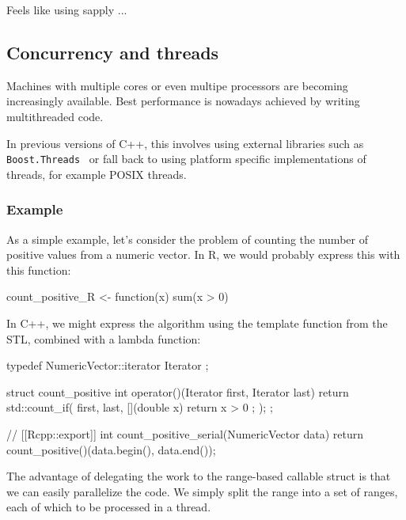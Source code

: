 Feels like using sapply ...

\subsection{Concurrency and threads}

Machines with multiple cores or even multipe 
processors are becoming increasingly available. Best performance 
is nowadays achieved by writing multithreaded code. 

In previous versions of C++, this involves using external libraries 
such as \texttt{Boost.Threads}~\citep{KempfBoostThreads} 
or fall back to using platform specific 
implementations of threads, for example POSIX threads. 

\subsubsection{Example}

As a simple example, let's consider the problem of counting the number
of positive values from a numeric vector. In R, we would probably express this
with this function: 

\begin{example}
count_positive_R <- function(x){
  sum(x > 0)
}
\end{example}

In C++, we might express the algorithm using the  template
function from the STL, combined with a lambda function:

\begin{example}
typedef NumericVector::iterator Iterator ;

struct count_positive {
  int operator()(Iterator first, Iterator last){
    return std::count_if( first, last, 
      [](double x){ return x > 0 ; } 
    );    
  }
} ;

// [[Rcpp::export]]
int count_positive_serial(NumericVector data){
  return count_positive()(data.begin(), data.end());
}
\end{example}

The advantage of delegating the work to the range-based callable 
 struct is that we can easily 
parallelize the code. We simply split the range into a set of ranges, 
each of which to be processed in a thread. 

